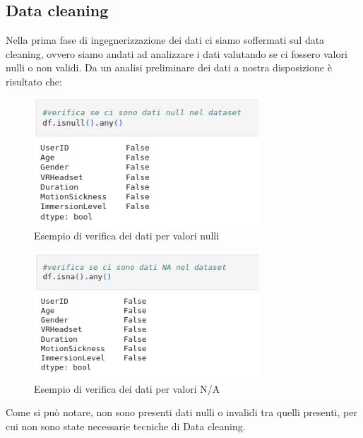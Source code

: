 \subsection{Data cleaning}
\fancyhead{}    %
Nella prima fase di ingegnerizzazione dei dati ci siamo soffermati sul data cleaning, ovvero siamo andati ad analizzare i dati valutando se ci fossero valori nulli o non validi.
Da un analisi preliminare dei dati a nostra disposizione è risultato che:

\begin{figure}[h]
    \centering
    \includegraphics[width=0.75\textwidth]{MetaClassAI_Documentazione/3/img/ValoriNULLDataset.png}
    \caption{Esempio di verifica dei dati per valori nulli}
    \label{fig:verifica-null-dataset}
\end{figure}

\begin{figure}[h]
    \centering
    \includegraphics[width=0.75\textwidth]{MetaClassAI_Documentazione/3/img/ValoriNADataset.png}
    \caption{Esempio di verifica dei dati per valori N/A}
    \label{fig:verifica-NA-dataset}
\end{figure}
Come si può notare, non sono presenti dati nulli o invalidi tra quelli presenti, per cui non sono state necessarie tecniche di Data cleaning.
